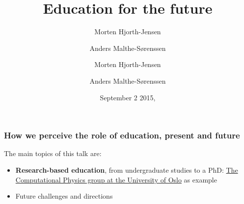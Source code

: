 \documentclass{beamer}
\begin{document}







\title{Education for the future}


\author{Morten Hjorth-Jensen
\and
Anders Malthe-Sørenssen}



\author{Morten Hjorth-Jensen
\and
Anders Malthe-Sørenssen}

\date{September 2 2015, 
}

\begin{frame}
\titlepage
\end{frame}

\begin{frame}
\frametitle{How we perceive the role of education, present and future}

\begin{block}{}
The main topics of this talk are:

\begin{itemize}
\item \textbf{Research-based education}, from undergraduate studies to a PhD: \href{{http://www.mn.uio.no/fysikk/english/research/groups/computational/index.html}}{The Computational Physics group at the University of Oslo} as example

\item Future challenges and directions
\end{itemize}

\noindent
\end{block}
\end{frame}
\end{document}
